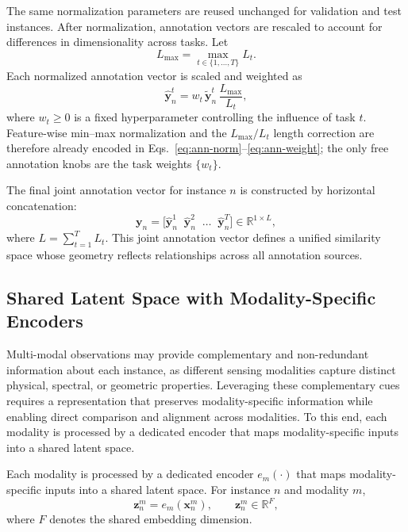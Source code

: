\documentclass[10pt,twocolumn,letterpaper]{article}
\begin{document}
\noindent The same normalization parameters are reused unchanged for validation and test instances. After normalization, annotation vectors are rescaled to account for differences in dimensionality across tasks.
Let
\[
L_{\max} = \max_{t \in \{1,\dots,T\}} L_t .
\]
Each normalized annotation vector is scaled and weighted as
\begin{equation}
\label{eq:ann-weight}
\hat{\mathbf{y}}^{t}_{n}
=
w_t \, \tilde{\mathbf{y}}^{t}_{n}\, \frac{L_{\max}}{L_t},
\end{equation}
where $w_t \ge 0$ is a fixed hyperparameter controlling the influence of task $t$. Feature-wise min--max normalization and the $L_{\max}/L_t$ length correction are therefore already encoded in Eqs.~\eqref{eq:ann-norm}--\eqref{eq:ann-weight}; the only free annotation knobs are the task weights $\{w_t\}$. 

The final joint annotation vector for instance $n$ is constructed by horizontal
concatenation:
\begin{equation}
\label{eq:ann-concat}
\mathbf{y}_{n}
=
\big[
\hat{\mathbf{y}}^{1}_{n}
\;\;
\hat{\mathbf{y}}^{2}_{n}
\;\;
\dots
\;\;
\hat{\mathbf{y}}^{T}_{n}
\big]
\in
\mathbb{R}^{1 \times L},
\end{equation}
where $L = \sum_{t=1}^{T} L_t$.
This joint annotation vector defines a unified similarity space whose geometry
reflects relationships across all annotation sources.


\subsection{Shared Latent Space with Modality-Specific Encoders}
\label{subsec:shared-latent-space}
Multi-modal observations may provide complementary and non-redundant information about each instance, as different sensing modalities capture distinct physical, spectral, or geometric properties. Leveraging these complementary cues requires a representation that preserves modality-specific information while enabling direct comparison and alignment across modalities. To this end, each modality is processed by a dedicated encoder that maps modality-specific inputs into a shared latent space.

Each modality is processed by a dedicated encoder
$e_m(\cdot)$ that maps modality-specific inputs into a shared latent space.
For instance $n$ and modality $m$,
\begin{equation}
\mathbf{z}_n^{m}
=
e_m\!\left(\mathbf{x}_n^{m}\right),
\qquad
\mathbf{z}_n^{m} \in \mathbb{R}^{F},
\end{equation}
where $F$ denotes the shared embedding dimension.
\end{document}
